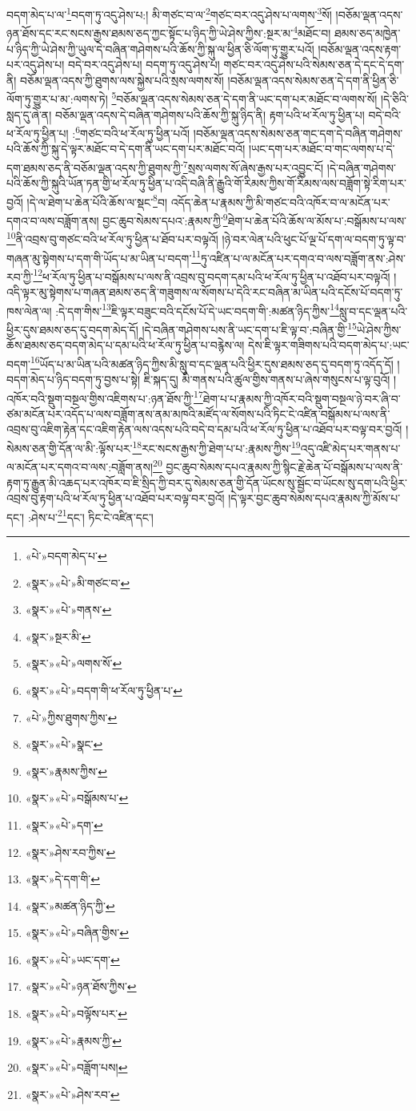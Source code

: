 བདག་མེད་པ་ལ་\footnote{«པེ་»བདག་མེད་པ་}བདག་ཏུ་འདུ་ཤེས་པ:། མི་གཙང་བ་ལ་\footnote{«སྣར་»«པེ་»མི་གཙང་བ་}གཙང་བར་འདུ་ཤེས་པ་ལགས་\footnote{«སྣར་»«པེ་»གནས་}སོ། །བཅོམ་ལྡན་འདས་ཉན་ཐོས་དང་རང་སངས་རྒྱས་ཐམས་ཅད་ཀྱང་སྟོང་པ་ཉིད་ཀྱི་ཡེ་ཤེས་ཀྱིས་:སྔར་མ་\footnote{«སྣར་»སྔར་མི་}མཐོང་བ། ཐམས་ཅད་མཁྱེན་པ་ཉིད་ཀྱི་ཡེ་ཤེས་ཀྱི་ཡུལ་དེ་བཞིན་གཤེགས་པའི་ཆོས་ཀྱི་སྐུ་ལ་ཕྱིན་ཅི་ལོག་ཏུ་གྱུར་པའོ། །བཅོམ་ལྡན་འདས་རྟག་པར་འདུ་ཤེས་པ། བདེ་བར་འདུ་ཤེས་པ། བདག་ཏུ་འདུ་ཤེས་པ། གཙང་བར་འདུ་ཤེས་པའི་སེམས་ཅན་དེ་དང་དེ་དག་ནི། བཅོམ་ལྡན་འདས་ཀྱི་ཐུགས་ལས་སྐྱེས་པའི་སྲས་ལགས་སོ། །བཅོམ་ལྡན་འདས་སེམས་ཅན་དེ་དག་ནི་ཕྱིན་ཅི་ལོག་ཏུ་གྱུར་པ་མ་:ལགས་ཏེ། \footnote{«སྣར་»«པེ་»ལགས་སོ་}བཅོམ་ལྡན་འདས་སེམས་ཅན་དེ་དག་ནི་ཡང་དག་པར་མཐོང་བ་ལགས་སོ། །དེ་ཅིའི་སླད་དུ་ཞེ་ན། བཅོམ་ལྡན་འདས་དེ་བཞིན་གཤེགས་པའི་ཆོས་ཀྱི་སྐུ་ཉིད་ནི། རྟག་པའི་ཕ་རོལ་ཏུ་ཕྱིན་པ། བདེ་བའི་ཕ་རོལ་ཏུ་ཕྱིན་པ། :\footnote{«སྣར་»«པེ་»བདག་གི་ཕ་རོལ་ཏུ་ཕྱིན་པ་}གཙང་བའི་ཕ་རོལ་ཏུ་ཕྱིན་པའོ། །བཅོམ་ལྡན་འདས་སེམས་ཅན་གང་དག་དེ་བཞིན་གཤེགས་པའི་ཆོས་ཀྱི་སྐུ་དེ་ལྟར་མཐོང་བ་དེ་དག་ནི་ཡང་དག་པར་མཐོང་བའོ། །ཡང་དག་པར་མཐོང་བ་གང་ལགས་པ་དེ་དག་ཐམས་ཅད་ནི་བཅོམ་ལྡན་འདས་ཀྱི་ཐུགས་ཀྱི་\footnote{«པེ་»ཀྱིས་ཐུགས་ཀྱིས་}སྲས་ལགས་སོ་ཞེས་རྒྱས་པར་འབྱུང་ངོ། །དེ་བཞིན་གཤེགས་པའི་ཆོས་ཀྱི་སྐུའི་ཡོན་ཏན་གྱི་ཕ་རོལ་ཏུ་ཕྱིན་པ་འདི་བཞི་ནི་རྒྱུའི་གོ་རིམས་ཀྱིས་གོ་རིམས་ལས་བཟློག་སྟེ་རིག་པར་བྱའོ། །དེ་ལ་ཐེག་པ་ཆེན་པོའི་ཆོས་ལ་སྡང་\footnote{«སྣར་»«པེ་»སྣང་}བ། འདོད་ཆེན་པ་རྣམས་ཀྱི་མི་གཙང་བའི་འཁོར་བ་ལ་མངོན་པར་དགའ་བ་ལས་བཟློག་ནས། བྱང་ཆུབ་སེམས་དཔའ་:རྣམས་ཀྱི་\footnote{«སྣར་»རྣམས་ཀྱིས་}ཐེག་པ་ཆེན་པོའི་ཆོས་ལ་མོས་པ་:བསྒོམས་པ་ལས་\footnote{«སྣར་»«པེ་»བསྒོམས་པ་}ནི་འབྲས་བུ་གཙང་བའི་ཕ་རོལ་ཏུ་ཕྱིན་པ་ཐོབ་པར་བལྟའོ། །ཉེ་བར་ལེན་པའི་ཕུང་པོ་ལྔ་པོ་དག་ལ་བདག་ཏུ་ལྟ་བ་གཞན་མུ་སྟེགས་པ་དག་གི་ཡོད་པ་མ་ཡིན་པ་བདག་\footnote{«སྣར་»«པེ་»དག་}ཏུ་འཛིན་པ་ལ་མངོན་པར་དགའ་བ་ལས་བཟློག་ནས་:ཤེས་རབ་ཀྱི་\footnote{«སྣར་»ཤེས་རབ་ཀྱིས་}ཕ་རོལ་ཏུ་ཕྱིན་པ་བསྒོམས་པ་ལས་ནི་འབྲས་བུ་བདག་དམ་པའི་ཕ་རོལ་ཏུ་ཕྱིན་པ་འཐོབ་པར་བལྟའོ། །འདི་ལྟར་མུ་སྟེགས་པ་གཞན་ཐམས་ཅད་ནི་གཟུགས་ལ་སོགས་པ་དེའི་རང་བཞིན་མ་ཡིན་པའི་དངོས་པོ་བདག་ཏུ་ཁས་ལེན་ལ། :དེ་དག་གིས་\footnote{«སྣར་»དེ་དག་གི་}ཇི་ལྟར་བཟུང་བའི་དངོས་པོ་དེ་ཡང་བདག་གི་:མཚན་ཉིད་ཀྱིས་\footnote{«སྣར་»མཚན་ཉིད་ཀྱི་}སླུ་བ་དང་ལྡན་པའི་ཕྱིར་དུས་ཐམས་ཅད་དུ་བདག་མེད་དོ། །དེ་བཞིན་གཤེགས་པས་ནི་ཡང་དག་པ་ཇི་ལྟ་བ་:བཞིན་གྱི་\footnote{«སྣར་»«པེ་»བཞིན་གྱིས་}ཡེ་ཤེས་ཀྱིས་ཆོས་ཐམས་ཅད་བདག་མེད་པ་དམ་པའི་ཕ་རོལ་ཏུ་ཕྱིན་པ་བརྙེས་ལ། དེས་ཇི་ལྟར་གཟིགས་པའི་བདག་མེད་པ་:ཡང་བདག་\footnote{«སྣར་»«པེ་»ཡང་དག་}ཡོད་པ་མ་ཡིན་པའི་མཚན་ཉིད་ཀྱིས་མི་སླུ་བ་དང་ལྡན་པའི་ཕྱིར་དུས་ཐམས་ཅད་དུ་བདག་ཏུ་འདོད་དོ། །བདག་མེད་པ་ཉིད་བདག་ཏུ་བྱས་པ་སྟེ། ཇི་སྐད་དུ། མི་གནས་པའི་ཚུལ་གྱིས་གནས་པ་ཞེས་གསུངས་པ་ལྟ་བུའོ། །འཁོར་བའི་སྡུག་བསྔལ་གྱིས་འཇིགས་པ་:ཉན་ཐོས་ཀྱི་\footnote{«སྣར་»«པེ་»ཉན་ཐོས་ཀྱིས་}ཐེག་པ་པ་རྣམས་ཀྱི་འཁོར་བའི་སྡུག་བསྔལ་ཉེ་བར་ཞི་བ་ཙམ་མངོན་པར་འདོད་པ་ལས་བཟློག་ནས་ནམ་མཁའི་མཛོད་ལ་སོགས་པའི་ཏིང་ངེ་འཛིན་བསྒོམས་པ་ལས་ནི་འབྲས་བུ་འཇིག་རྟེན་དང་འཇིག་རྟེན་ལས་འདས་པའི་བདེ་བ་དམ་པའི་ཕ་རོལ་ཏུ་ཕྱིན་པ་འཐོབ་པར་བལྟ་བར་བྱའོ། །སེམས་ཅན་གྱི་དོན་ལ་མི་:ལྟོས་པར་\footnote{«སྣར་»«པེ་»བལྟོས་པར་}རང་སངས་རྒྱས་ཀྱི་ཐེག་པ་པ་:རྣམས་ཀྱིས་\footnote{«སྣར་»«པེ་»རྣམས་ཀྱི་}འདུ་འཛི་མེད་པར་གནས་པ་ལ་མངོན་པར་དགའ་བ་ལས་:བཟློག་ནས།\footnote{«སྣར་»«པེ་»བཟློག་པས།} བྱང་ཆུབ་སེམས་དཔའ་རྣམས་ཀྱི་སྙིང་རྗེ་ཆེན་པོ་བསྒོམས་པ་ལས་ནི་རྟག་ཏུ་རྒྱུན་མི་འཆད་པར་འཁོར་བ་ཇི་སྲིད་ཀྱི་བར་དུ་སེམས་ཅན་གྱི་དོན་ཡོངས་སུ་སྦྱོང་བ་ཡོངས་སུ་དག་པའི་ཕྱིར་འབྲས་བུ་རྟག་པའི་ཕ་རོལ་ཏུ་ཕྱིན་པ་འཐོབ་པར་བལྟ་བར་བྱའོ། །དེ་ལྟར་བྱང་ཆུབ་སེམས་དཔའ་རྣམས་ཀྱི་མོས་པ་དང་། :ཤེས་པ་\footnote{«སྣར་»«པེ་»ཤེས་རབ་}དང་། ཏིང་ངེ་འཛིན་དང་། 
